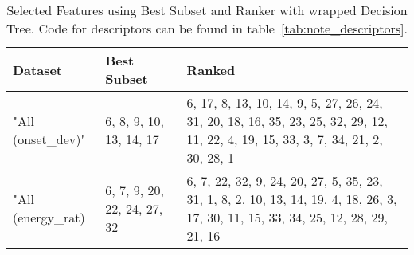 \begin{table}[ht!]
\centering
  \caption[Selected Features using Ranker and Best Subset with wrapped Decision Tree]{Selected Features using Best Subset and Ranker with wrapped Decision Tree. Code for descriptors can be found in table~\ref{tab:note_descriptors}.}
  \label{tab:feature_selection}
  \begin{tabular}{  l l p{6cm} }
    \hline
    Dataset & Best Subset & Ranked \\ \hline
    "All (onset\_dev)" & 6, 8, 9, 10, 13, 14, 17 &  6, 17, 8, 13, 10, 14, 9, 5, 27, 26, 24, 31, 20, 18, 16, 35, 23, 25, 32, 29, 12, 11, 22, 4, 19, 15, 33, 3, 7, 34, 21, 2, 30, 28, 1 \\
    "All (energy\_rat) & 6, 7, 9, 20, 22, 24, 27, 32 & 6, 7, 22, 32, 9, 24, 20, 27, 5, 35, 23, 31, 1, 8, 2, 10, 13, 14, 19, 4, 18, 26, 3, 17, 30, 11, 15, 33, 34, 25, 12, 28, 29, 21, 16  \\
    
    \hline
  \end{tabular}

\end{table}
